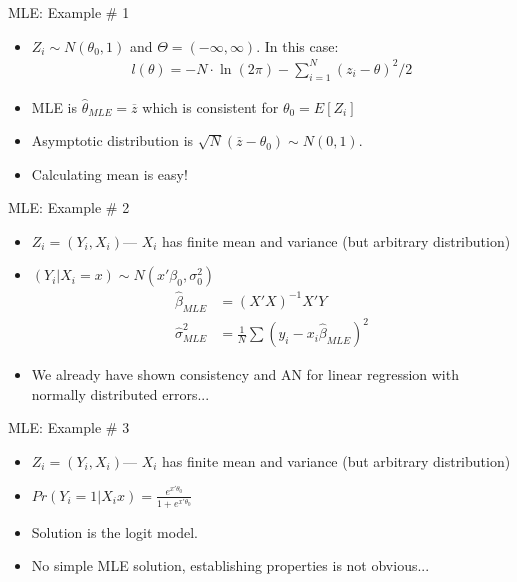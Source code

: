 \documentclass[aspectratio=169]{beamer}
\begin{document}
\begin{frame}{MLE: Example \# 1}
\begin{itemize}
\item $Z_i \sim N(\theta_0,1)$ and $\Theta = (-\infty,\infty)$. In this case:
\begin{align*}
l ( \theta ) = - N \cdot \ln ( 2 \pi ) - \sum _ { i = 1 } ^ { N } \left( z _ { i } - \theta \right) ^ { 2 } / 2
\end{align*}
\item MLE is $\widehat{\theta}_{MLE}=\overline{z}$ which is consistent for $\theta_0 = E[Z_i]$
\item Asymptotic distribution is $\sqrt{N} ( \overline{z}-\theta_0) \sim N(0,1)$.
\item Calculating mean is easy!
\end{itemize}
\end{frame}




\begin{frame}{MLE: Example \# 2}
\begin{itemize}
\item $Z_i = (Y_i, X_i)$---   $X_i$ has finite mean and variance (but arbitrary distribution)
\item $(Y_i | X_i  =x) \sim N(x' \beta_0, \sigma_0^2)$
\begin{align*}
\widehat{\beta}_{MLE} &= (X'X)^{-1} X'Y\\
\widehat{\sigma}^2_{MLE} &= \frac{1}{N} \sum (y_i - x_i \widehat{\beta}_{MLE})^2
\end{align*}
\item We already have shown consistency and AN for linear regression with normally distributed errors...
\end{itemize}
\end{frame}


\begin{frame}{MLE: Example \# 3}
\begin{itemize}
\item $Z_i = (Y_i, X_i)$---   $X_i$ has finite mean and variance (but arbitrary distribution)
\item $Pr(Y_i=1 | X_i  x) =  \frac{e^{x' \theta_0}}{1+ e^{x'\theta_0}}$
\item Solution is the \alert{logit} model.
\item No simple MLE solution, establishing properties is not obvious...
\end{itemize}
\end{frame}
\end{document}
